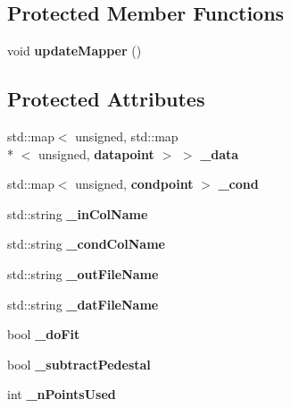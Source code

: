 \subsection*{Protected Member Functions}
\begin{DoxyCompactItemize}
\item 
void {\bfseries update\-Mapper} ()\label{classExtractSaturationCurveProcessor_aae75a6b00dd5dc100b72aa560c1ee56c}

\end{DoxyCompactItemize}
\subsection*{Protected Attributes}
\begin{DoxyCompactItemize}
\item 
std\-::map$<$ unsigned, std\-::map\\*
$<$ unsigned, {\bf datapoint} $>$ $>$ {\bfseries \-\_\-data}\label{classExtractSaturationCurveProcessor_a9489d528a0de4bc27112d94c2c521e63}

\item 
std\-::map$<$ unsigned, {\bf condpoint} $>$ {\bfseries \-\_\-cond}\label{classExtractSaturationCurveProcessor_ad25bcf441fa19842d9c5c308833ba76f}

\item 
std\-::string {\bfseries \-\_\-in\-Col\-Name}\label{classExtractSaturationCurveProcessor_a50a69322210ddb62c82e3893169fa3ff}

\item 
std\-::string {\bfseries \-\_\-cond\-Col\-Name}\label{classExtractSaturationCurveProcessor_af34cd07d0d5edc67db05c9c397ac4e83}

\item 
std\-::string {\bfseries \-\_\-out\-File\-Name}\label{classExtractSaturationCurveProcessor_ab0cc84c9082e3d56fd66a84454b9a1a8}

\item 
std\-::string {\bfseries \-\_\-dat\-File\-Name}\label{classExtractSaturationCurveProcessor_aac6032684847dec6c51f8000895c906c}

\item 
bool {\bfseries \-\_\-do\-Fit}\label{classExtractSaturationCurveProcessor_a5a9f91b2696b05338c42acd717d396ec}

\item 
bool {\bfseries \-\_\-subtract\-Pedestal}\label{classExtractSaturationCurveProcessor_a81c12c771d8715003b68cdd155b93ede}

\item 
int {\bfseries \-\_\-n\-Points\-Used}\label{classExtractSaturationCurveProcessor_a83bcac5b9e763bc07522c99028dc4da3}


\end{DoxyCompactItemize}
